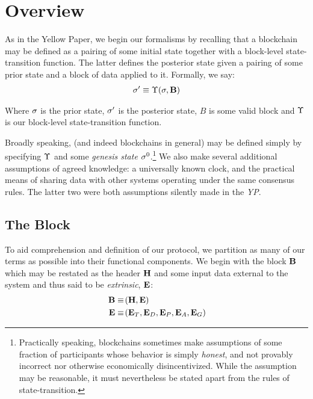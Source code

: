 \section{Overview}\label{sec:overview}

As in the Yellow Paper, we begin our formalisms by recalling that a blockchain may be defined as a pairing of some initial state together with a block-level state-transition function. The latter defines the posterior state given a pairing of some prior state and a block of data applied to it. Formally, we say:
\begin{align}\label{eq:statetransition}
\sigma' \equiv \Upsilon(\sigma, \mathbf{B})
\end{align}

Where $\sigma$ is the prior state, $\sigma'$ is the posterior state, $B$ is some valid block and $\Upsilon$ is our block-level state-transition function.

Broadly speaking, \Jam (and indeed blockchains in general) may be defined simply by specifying $\Upsilon$ and some \emph{genesis state} $\sigma^0$.\footnote{Practically speaking, blockchains sometimes make assumptions of some fraction of participants whose behavior is simply \emph{honest}, and not provably incorrect nor otherwise economically disincentivized. While the assumption may be reasonable, it must nevertheless be stated apart from the rules of state-transition.} We also make several additional assumptions of agreed knowledge: a universally known clock, and the practical means of sharing data with other systems operating under the same consensus rules. The latter two were both assumptions silently made in the \emph{YP}.

\subsection{The Block}

To aid comprehension and definition of our protocol, we partition as many of our terms as possible into their functional components. We begin with the block $\mathbf{B}$ which may be restated as the header $\mathbf{H}$ and some input data external to the system and thus said to be \emph{extrinsic}, $\mathbf{E}$:
\begin{align}
  \label{eq:block}\block &\equiv \tup{\header, \extrinsic} \\
  \label{eq:extrinsic}\extrinsic &\equiv \tup{\xttickets, \xtdisputes, \xtpreimages, \xtassurances, \xtguarantees}
\end{align}

